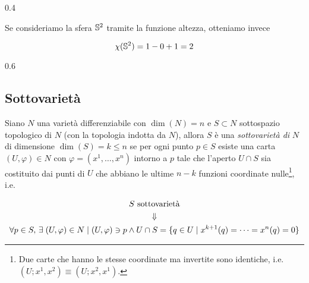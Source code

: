 	{0.4}{%
			}

Se consideriamo la sfera $ \S^{2} $ tramite la funzione altezza, otteniamo invece

\begin{equation}
	\chi(\S^{2}) = 1 - 0 + 1 = 2
\end{equation}

	{0.6}{%
			}

\subsection{Sottovarietà}

Siano $ N $ una varietà differenziabile con $ \dim(N) = n $ e $ S \subset N $ sottospazio topologico di $ N $ (con la topologia indotta da $ N $), allora $ S $ è una \textit{sottovarietà di} $ N $ di dimensione $ \dim(S) = k \leqslant n $ se per ogni punto $ p \in S $ esiste una carta $ (U,\varphi) \in N $ con $ \varphi = (x^{1},\dots,x^{n}) $ intorno a $ p $ tale che l'aperto $ U \cap S $ sia costituito dai punti di $ U $ che abbiano le ultime $ n-k $ funzioni coordinate nulle\footnote{%
	Due carte che hanno le stesse coordinate ma invertite sono identiche, i.e. $ (U;x^{1},x^{2}) \equiv (U;x^{2},x^{1}) $.%
}, i.e.

\begin{gather}
	S \text{ sottovarietà} \nonumber \\
	\Downarrow \\
	\forall p \in S, \, \E (U,\varphi) \in N \mid (U,\varphi) \ni p \wedge U \cap S = \{ q \in U \mid x^{k+1}(q) = \dots = x^{n}(q) = 0 \} \nonumber
\end{gather}

